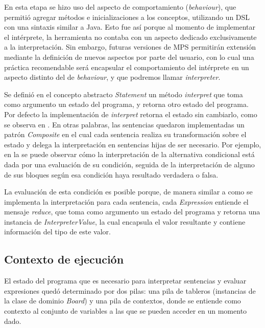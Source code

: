 En esta etapa se hizo uso del aspecto de comportamiento (\textit{behaviour}), que permitió agregar métodos e inicializaciones a los conceptos, utilizando un DSL con una sintaxis similar a Java. Esto fue así porque al momento de implementar el intérprete, la herramienta no contaba con un aspecto dedicado exclusivamente a la interpretación. Sin embargo, futuras versiones de MPS permitirán extensión mediante la definición de nuevos aspectos por parte del usuario, con lo cual una práctica recomendable será encapsular el comportamiento del intérprete en un aspecto distinto del de \textit{behaviour}, y que podremos llamar \textit{interpreter}.

Se definió en el concepto abstracto \textit{Statement} un método \textit{interpret} que toma como argumento un estado del programa, y retorna otro estado del programa. Por defecto la implementación de \textit{interpret} retorna el estado sin cambiarlo, como se observa en . En otras palabras, las sentencias quedaron implementadas un patrón \textit{Composite} \cite{Gamma} en el cual cada sentencia realiza su transformación sobre el estado y delega la interpretación en sentencias hijas de ser necesario. Por ejemplo, en la  se puede observar cómo la interpretación de la alternativa condicional está dada por una evaluación de su condición, seguida de la interpretación de alguno de sus bloques según esa condición haya resultado verdadera o falsa.





La evaluación de esta condición es posible porque, de manera similar a como se implementa la interpretación para cada sentencia, cada \textit{Expression} entiende el mensaje \textit{reduce}, que toma como argumento un estado del programa y retorna una instancia de \textit{InterpreterValue}, la cual encapsula el valor resultante y contiene información del tipo de este valor. 

\subsection{Contexto de ejecución}

El estado del programa que es necesario para interpretar sentencias y evaluar expresiones quedó determinado por dos pilas: una pila de tableros (instancias de la clase de dominio \textit{Board}) y una pila de contextos, donde se entiende como contexto al conjunto de variables a las que se pueden acceder en un momento dado.

